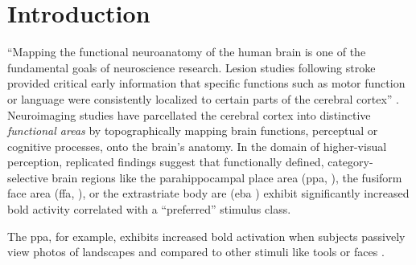 





\section{Introduction}


``Mapping the functional neuroanatomy of the human brain is one of the
fundamental goals of neuroscience research. Lesion studies following stroke
provided critical early information that specific functions such as motor
function or language were consistently localized to certain parts of the
cerebral cortex'' \citep{satterthwaite2015towards}.
%
Neuroimaging studies have parcellated the cerebral cortex into distinctive
\textit{functional areas} by topographically mapping brain functions, perceptual
or cognitive processes, onto the brain's anatomy.
In the domain of higher-visual perception, replicated findings suggest that
functionally defined, category-selective brain regions like the parahippocampal
place area (\ac{ppa}, \citep{epstein1998ppa}), the fusiform face area (\ac{ffa},
\citep{kanwisher1997ffa}), or the extrastriate body are (\ac{eba}
\citep{downing2001bodyarea}) exhibit significantly increased \ac{bold} activity
correlated with a ``preferred'' stimulus class.

The \ac{ppa}, for example, exhibits increased \ac{bold} activation when subjects
passively view photos of landscapes and compared to other stimuli like tools or
faces \citep{aguirre1998area, epstein1998ppa}.


